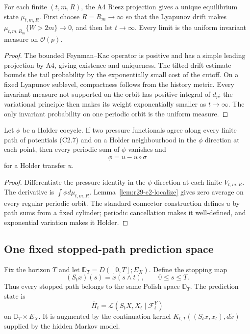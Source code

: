 \begin{lemma}
\label{lem:r29-c2-localize}
For each finite $(t,m,R)$, the A4 Riesz projection gives a unique equilibrium
state $\mu_{t,m,R}$.  First choose $R=R_m\to\infty$ so that the Lyapunov drift
makes
$\mu_{t,m,R_m}\{W>2m\}\to0$, and then let $t\to\infty$.  Every limit is the
uniform invariant measure on $\mathcal O(p)$.
\end{lemma}

\begin{proof}
The bounded Feynman--Kac operator is positive and has a simple leading
projection by A4, giving existence and uniqueness.  The tilted drift estimate
bounds the tail probability by the exponentially small cost of the cutoff.
On a fixed Lyapunov sublevel, compactness follows from the history metric.
Every invariant measure not supported on the orbit has positive integral of
$d_p$; the variational principle then makes its weight exponentially smaller
as $t\to\infty$.  The only invariant probability on one periodic orbit is the
uniform measure.
\end{proof}

\begin{theorem}
\label{thm:r29-c2-rigidity}
Let $\phi$ be a Holder cocycle.  If two pressure functionals agree along every
finite path of potentials (C2.7) and on a Holder neighbourhood in the
$\phi$ direction at each point, then every periodic sum of $\phi$ vanishes and
\[
 \phi=u-u\circ\sigma                                    \tag{C2.8}
\]
for a Holder transfer $u$.
\end{theorem}

\begin{proof}
Differentiate the pressure identity in the $\phi$ direction at each finite
$V_{t,m,R}$.  The derivative is
$\int\phi d\mu_{t,m,R}$.  Lemma~\ref{lem:r29-c2-localize} gives zero average
on every regular periodic orbit.  The standard connector construction defines
$u$ by path sums from a fixed cylinder; periodic cancellation makes it
well-defined, and exponential variation makes it Holder.
\end{proof}

\subsection{One fixed stopped-path prediction space}

Fix the horizon $T$ and let $\mathbb D_T=D([0,T];E_X)$.  Define the stopping
map
\[
 (S_tx)(s)=x(s\wedge t),\qquad 0\le s\le T.               \tag{C2.9}
\]
Thus every stopped path belongs to the same Polish space $\mathbb D_T$.  The
prediction state is
\[
 \bar\Pi_t=\mathcal L(S_tX,X_t\mid\mathcal F_t^Y)          \tag{C2.10}
\]
on $\mathbb D_T\times E_X$.  It is augmented by the continuation kernel
$K_{t,T}((S_tx,x_t),d\widetilde x)$ supplied by the hidden Markov model.


